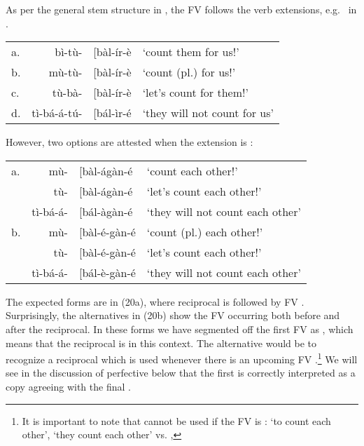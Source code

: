 \documentclass[output=paper,
modfonts
]{LSP/langsci}
\begin{document}
\noindent As per the general  stem structure in , the FV follows the verb
extensions, e.g.\   in .

\ea \label{ex:hyman:19}\begin{tabular}[t]{@{}lr@{}ll}
a. & bì-tù- & {[}bàl-ír-è & `count them for us!'\\
b. & mù-tù- & {[}bàl-ír-è & `count (pl.) for us!'\\
c. & tù-bà- & {[}bàl-ír-è & `let's count for them!'\\
d. & tì-bá-á-tú- & {[}bál-ìr-é & `they will not count for us' \\
\end{tabular}
\z

\noindent However, two options are attested when the extension is :

\ea \label{ex:hyman:20}\begin{tabular}[t]{@{}lr@{}ll}
a. & mù- & {[}bàl-ágàn-é & `count each other!'\\
 & tù- & {[}bàl-ágàn-é & `let's count each other!'\\
 & tì-bá-á- & {[}bál-àgàn-é & `they will not count each other'\\
b. & mù- & {[}bàl-é-gàn-é & `count (pl.) each other!'\\
 & tù- & {[}bàl-é-gàn-é & `let's count each other!'\\
 & tì-bá-á- & {[}bál-è-gàn-é & `they will not count each other' \\
 \end{tabular}
 \z

\noindent The expected forms are in (20a), where reciprocal  is
followed by FV . Surprisingly, the alternatives in (20b) show
the FV  occurring both before and after the reciprocal. In
these forms we have segmented off the first FV as , which
means that the reciprocal  is  in this context.
The alternative would be to recognize a reciprocal 
 which is used whenever there is an upcoming FV
.\footnote{It is important to note that  cannot
  be used if the FV is : \form{ò-kú-{[}bál-ágán-á} `to count
  each other', \form{bà-{[}bàl-ágán-á} `they count each other' vs.
  \form{*ò-kú-{[}bál-é-gán-á}, \form{*bà-{[}bàl-é-gán-á.}} We will see
in the discussion of perfective  below that the first
 is correctly interpreted as a copy agreeing with the final
.
\end{document}
